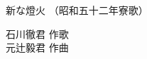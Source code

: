 \documentclass[10pt,b5j]{tarticle} %
\begin{document}
\begin{minipage}[c]{0.7\hsize} %
    \begin{center}
        {\LARGE
            新な燈火 %
        }
        {\small 
            （昭和五十二年寮歌） %
        }
    \end{center}
\end{minipage}
\begin{minipage}[c]{0.3\hsize} %
    \begin{flushright} %
        石川徹君 作歌\\元辻毅君 作曲 %
    \end{flushright}
\end{minipage}
\end{document}
